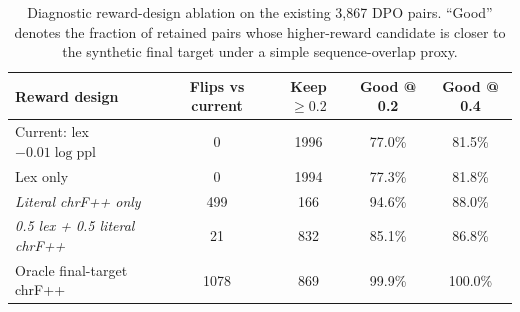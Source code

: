 \begin{table}[t]
\centering
\small
\begin{tabular}{lcccc}
\toprule
Reward design & Flips vs current & Keep $\ge 0.2$ & Good @ 0.2 & Good @ 0.4 \\
\midrule
Current: lex $- 0.01 \log \mathrm{ppl}$ & 0 & 1996 & 77.0\% & 81.5\% \\
Lex only & 0 & 1994 & 77.3\% & 81.8\% \\
\textit{Literal chrF++ only} & 499 & 166 & 94.6\% & 88.0\% \\
\textit{0.5 lex + 0.5 literal chrF++} & 21 & 832 & 85.1\% & 86.8\% \\
Oracle final-target chrF++ & 1078 & 869 & 99.9\% & 100.0\% \\
\bottomrule
\end{tabular}
\caption{Diagnostic reward-design ablation on the existing 3,867 DPO pairs. ``Good'' denotes the fraction of retained pairs whose higher-reward candidate is closer to the synthetic final target under a simple sequence-overlap proxy.}
\label{tab:reward-design-ablation}
\end{table}
